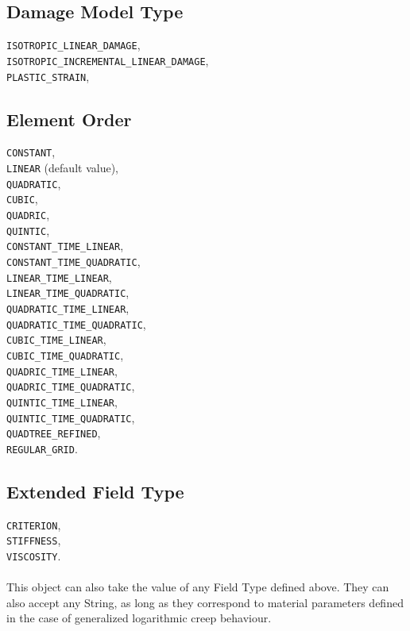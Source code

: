 \documentclass[10pt]{article}
\begin{document}
\subsection{Damage Model Type}

\verb+ISOTROPIC_LINEAR_DAMAGE+,\\
\verb+ISOTROPIC_INCREMENTAL_LINEAR_DAMAGE+,\\
\verb+PLASTIC_STRAIN+,


\subsection{Element Order}

	\verb+CONSTANT+, \\
	\verb+LINEAR+ (default value), \\
	\verb+QUADRATIC+,\\
    \verb+CUBIC+,\\
    \verb+QUADRIC+,\\
    \verb+QUINTIC+,\\
    \verb+CONSTANT_TIME_LINEAR+,\\
    \verb+CONSTANT_TIME_QUADRATIC+,\\
    \verb+LINEAR_TIME_LINEAR+,\\
    \verb+LINEAR_TIME_QUADRATIC+,\\
    \verb+QUADRATIC_TIME_LINEAR+,\\
    \verb+QUADRATIC_TIME_QUADRATIC+,\\
    \verb+CUBIC_TIME_LINEAR+,\\
    \verb+CUBIC_TIME_QUADRATIC+,\\
    \verb+QUADRIC_TIME_LINEAR+,\\
    \verb+QUADRIC_TIME_QUADRATIC+,\\
    \verb+QUINTIC_TIME_LINEAR+,\\
    \verb+QUINTIC_TIME_QUADRATIC+,\\
    \verb+QUADTREE_REFINED+,\\
    \verb+REGULAR_GRID+.

\subsection{Extended Field Type}

    \verb+CRITERION+,\\
    \verb+STIFFNESS+,\\
    \verb+VISCOSITY+.
    
\paragraph{} This object can also take the value of any Field Type defined above. They can also accept any String, as long as they correspond to material parameters defined in the case of generalized logarithmic creep behaviour.
\end{document}
